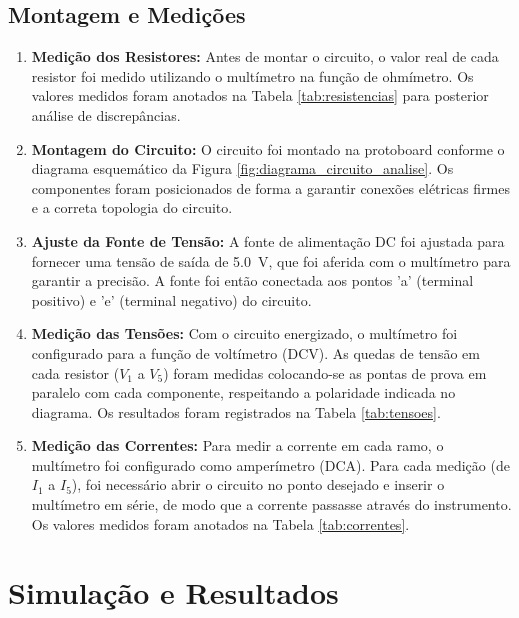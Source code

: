 \documentclass[a4paper, 12pt]{article}
\begin{document}
\subsection{Montagem e Medições}
\begin{enumerate}
\item \textbf{Medição dos Resistores:} Antes de montar o circuito, o valor real de cada resistor foi medido utilizando o multímetro na função de ohmímetro. Os valores medidos foram anotados na Tabela \ref{tab:resistencias} para posterior análise de discrepâncias.

\item \textbf{Montagem do Circuito:} O circuito foi montado na protoboard conforme o diagrama esquemático da Figura \ref{fig:diagrama_circuito_analise}. Os componentes foram posicionados de forma a garantir conexões elétricas firmes e a correta topologia do circuito.

\item \textbf{Ajuste da Fonte de Tensão:} A fonte de alimentação DC foi ajustada para fornecer uma tensão de saída de \SI{5.0}{\volt}, que foi aferida com o multímetro para garantir a precisão. A fonte foi então conectada aos pontos 'a' (terminal positivo) e 'e' (terminal negativo) do circuito.

\item \textbf{Medição das Tensões:} Com o circuito energizado, o multímetro foi configurado para a função de voltímetro (DCV). As quedas de tensão em cada resistor ($V_1$ a $V_5$) foram medidas colocando-se as pontas de prova em paralelo com cada componente, respeitando a polaridade indicada no diagrama. Os resultados foram registrados na Tabela \ref{tab:tensoes}.

\item \textbf{Medição das Correntes:} Para medir a corrente em cada ramo, o multímetro foi configurado como amperímetro (DCA). Para cada medição (de $I_1$ a $I_5$), foi necessário abrir o circuito no ponto desejado e inserir o multímetro em série, de modo que a corrente passasse através do instrumento. Os valores medidos foram anotados na Tabela \ref{tab:correntes}.
\end{enumerate}

\section{Simulação e Resultados}
\end{document}
